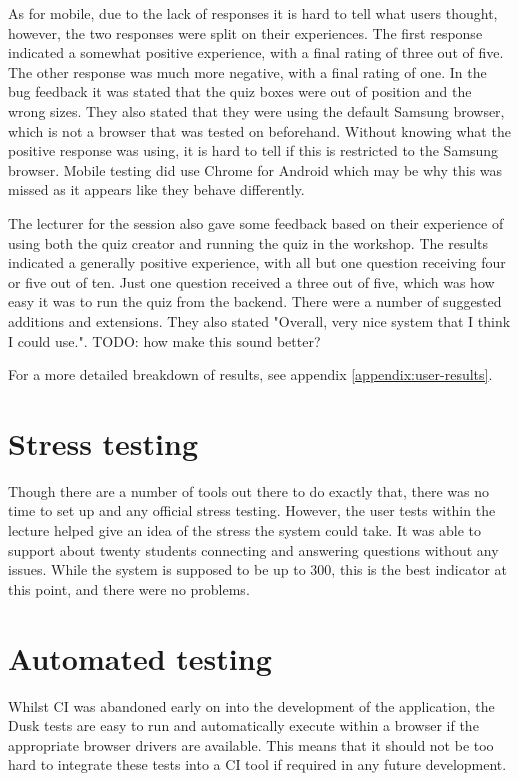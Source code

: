 As for mobile, due to the lack of responses it is hard to tell what users thought, however, the two responses were split on their experiences. The first response indicated a somewhat positive experience, with a final rating of three out of five. The other response was much more negative, with a final rating of one. In the bug feedback it was stated that the quiz boxes were out of position and the wrong sizes. They also stated that they were using the default Samsung browser, which is not a browser that was tested on beforehand. Without knowing what the positive response was using, it is hard to tell if this is restricted to the Samsung browser. Mobile testing did use Chrome for Android which may be why this was missed as it appears like they behave differently.

The lecturer for the session also gave some feedback based on their experience of using both the quiz creator and running the quiz in the workshop. The results indicated a generally positive experience, with all but one question receiving four or five out of ten. Just one question received a three out of five, which was how easy it was to run the quiz from the backend. There were a number of suggested additions and extensions. They also stated "Overall, very nice system that I think I could use.". TODO: how make this sound better?

For a more detailed breakdown of results, see appendix \ref{appendix:user-results}.

\section{Stress testing}
Though there are a number of tools out there to do exactly that, there was no time to set up and any official stress testing. However, the user tests within the lecture helped give an idea of the stress the system could take. It was able to support about twenty students connecting and answering questions without any issues. While the system is supposed to be up to 300, this is the best indicator at this point, and there were no problems.

\section{Automated testing}
Whilst CI was abandoned early on into the development of the application, the Dusk tests are easy to run and automatically execute within a browser if the appropriate browser drivers are available. This means that it should not be too hard to integrate these tests into a CI tool if required in any future development.